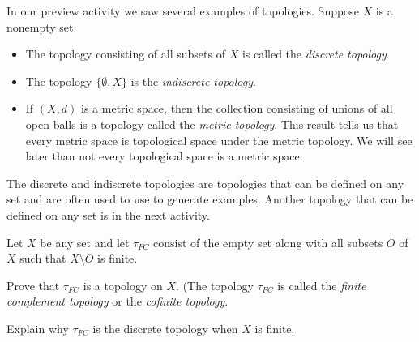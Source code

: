 \label{sec_exam_top}

In our preview activity we saw several examples of topologies. Suppose $X$ is a nonempty set.
\begin{itemize}
\item The topology consisting of all subsets of $X$ is called the \emph{discrete topology}.
\item The topology $\{\emptyset, X\}$ is the \emph{indiscrete topology}. 
\item If $(X,d)$ is a metric space, then the collection consisting of unions of all open balls is a topology called the \emph{metric topology}. This result tells us that every metric space is topological space under the metric topology. We will see later than not every topological space is a metric space. 
\end{itemize}
The discrete and indiscrete topologies are topologies that can be defined on any set and are often used to use to generate examples. Another topology that can be defined on any set is in the next activity. 

\begin{activity} \label{act:TS_limits} Let $X$ be any set and let $\tau_{FC}$ consist of the empty set along with all subsets $O$ of $X$ such that $X \setminus O$ is finite. 
\ba
\item Prove that $\tau_{FC}$ is a topology on $X$. (The topology $\tau_{FC}$ is called the \emph{finite complement topology} or the \emph{cofinite topology}. 

\item Explain why $\tau_{FC}$ is the discrete topology when $X$ is finite.

\ea

\end{activity}

